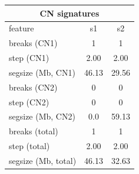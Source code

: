 \documentclass{standalone}
\begin{document}
\begin{tabular}{|l|c|c|}
\hline
\multicolumn{3}{|c|}{\textbf{CN signatures}}\\
\hline 

feature & s1 & s2 \\
\hline
breaks (CN1) & 1 & 1 \\
step (CN1) & 2.00 & 2.00 \\
segsize (Mb, CN1) & 46.13 & 29.56 \\
breaks (CN2) & 0 & 0 \\
step (CN2) & 0 & 0 \\
segsize (Mb, CN2) & 0.0 & 59.13 \\
breaks (total) & 1 & 1 \\
step (total) & 2.00 & 2.00 \\
segsize (Mb, total) & 46.13 & 32.63 \\
\hline
\end{tabular}
\end{document}
